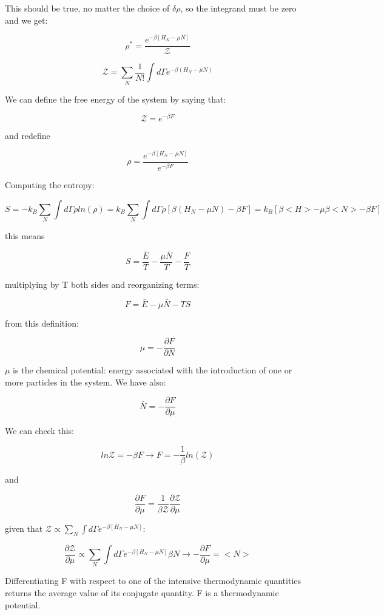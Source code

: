 \documentclass[a4paper, italian, openany]{book}
\begin{document}
This should be true, no matter the choice of $\delta \rho$, so the integrand must be zero and we get:

$$\rho^* =  \frac{e^{-\beta\left [ H_N - \mu N \right ]}}{\mathcal{Z}}$$

$$\mathcal{Z} = \sum_N \frac{1}{N!} \int d\Gamma e^{-\beta\left ( H_N - \mu N \right )} $$

We can define the free energy of the system by saying that:

$$\mathcal{Z} = e^{-\beta F}$$

and redefine 

$$\rho = \frac{e^{-\beta\left [ H_N - \mu N \right ]}}{e^{-\beta F}}$$

Computing the entropy:

$$S = -k_B \sum_N \int d\Gamma \rho ln(\rho) = k_B \sum_N \int d\Gamma \rho \left [ \beta(H_N - \mu N) -\beta F \right ] = k_B \left [ \beta <H> - \mu \beta <N> -\beta F \right ]$$

this means

$$S = \frac{\bar{E}}{T} - \frac{\mu \bar{N}}{T} - \frac{F}{T}$$

multiplying by T both sides and reorganizing terms:

$$F = \bar{E} - \mu\bar{N} -TS$$

from this definition:

$$\mu = -\frac{\partial F}{\partial N}$$

$\mu$ is the chemical potential: energy associated with the introduction of one or more particles in the system. We have also:

$$\bar{N} = -\frac{\partial F}{\partial \mu}$$

We can check this:

$$ln \mathcal{Z} = -\beta F \rightarrow F = -\frac{1}{\beta} ln(\mathcal{Z})$$

and

$$\frac{\partial F}{\partial \mu} = \frac{1}{\beta \mathcal{Z}} \frac{\partial \mathcal{Z}}{\partial \mu}$$

given that $\mathcal{Z} \propto \sum_N \int d\Gamma e^{-\beta\left [ H_N - \mu N \right ]}$:

$$\frac{\partial \mathcal{Z}}{\partial \mu} \propto \sum_N \int d\Gamma e^{-\beta \left [ H_N - \mu N \right ]} \beta N \rightarrow -\frac{\partial F}{\partial \mu} = <N>$$

Differentiating F with respect to one of the intensive thermodynamic quantities returns the average value of its conjugate quantity. F is a thermodynamic potential.
\end{document}
